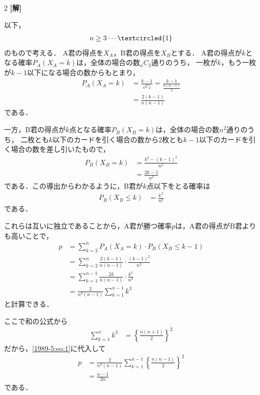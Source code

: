 \documentclass[../../../../main.tex]{subfiles}
\begin{document}
\setcounter{equation}{0}
\begin{oframed}
    
\end{oframed}
\setlength{\columnseprule}{0.4pt}
\begin{multicols}{2}
    {\bf[解]}

    以下，
    \begin{align*}
        n \ge 3 \cdots \textcircled{1}
    \end{align*}
    のもので考える．
    A君の得点を$X_A$，B君の得点を$X_B$とする．
    A君の得点が$k$となる確率$P_A(X_A=k)$は，全体の場合の数${}_nC_2$通りのうち，
    一枚が$k$，もう一枚が$k-1$以下になる場合の数からもとまり，
    \begin{align*}
        P_A(X_A=k)
         & = \frac{k-1}{{}_nC_2} = \frac{k-1}{\frac{n(n-1)}{2}} \\
         & = \frac{2(k-1)}{n(n-1)}
    \end{align*}
    である．

    一方，B君の得点が$k$点となる確率$P_B(X_B=k)$は，全体の場合の数$n^2$通りのうち，
    二枚とも$k$以下のカードを引く場合の数から2枚とも$k-1$以下のカードを引く場合の数を差し引いたもので，
    \begin{align*}
        P_B(X_B=k)
         & = \frac{k^2 - (k-1)^2}{n^2} \\
         & = \frac{2k-1}{n^2}
    \end{align*}
    である．この導出からわかるように，B君が$k$点以下をとる確率は
    \begin{align*}
        P_B(X_B\le k) & = \frac{k^2}{n^2}
    \end{align*}
    である．

    これらは互いに独立であることから，A君が勝つ確率$p$は，A君の得点がB君よりも高いことで，
    \begin{align}
        p
         & = \sum_{k=2}^n P_A(X_A=k) \cdot P_B(X_B\le k-1)                \\
         & = \sum_{k=2}^n \frac{2(k-1)}{n(n-1)} \cdot \frac{(k-1)^2}{n^2} \\
         & = \sum_{k=1}^{n-1} \frac{2k}{n(n-1)} \cdot \frac{k^2}{n^2}     \\
         & = \frac{2}{n^3(n-1)}\sum_{k=1}^{n-1} k^3  \label{1989-5:eq:1}
    \end{align}
    と計算できる．

    ここで和の公式から
    \begin{align*}
        \sum_{k=1}^{n} k^3 & = \left\{\frac{n(n+1)}{2}\right\}^2
    \end{align*}
    だから，\cref{1989-5:eq:1}に代入して
    \begin{align}
        p
         & = \frac{2}{n^3(n-1)}\sum_{k=1}^{n-1} \left\{\frac{n(n-1)}{2}\right\}^2 \\
         & = \frac{n-1}{2n} \label{1989-5:eq:2}
    \end{align}
    である．


\end{multicols}
\end{document}
